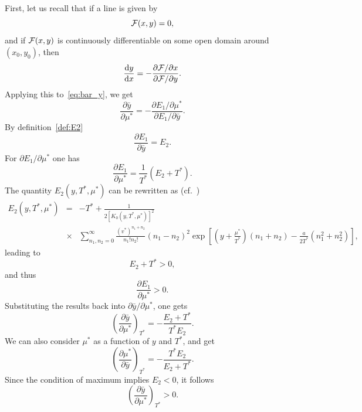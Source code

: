 \documentclass[12pt]{article}
\numberwithin{equation}{section}
\begin{document}
	First, let us recall that if a line is given by 
	\begin{equation*}
		{\cal F}(x,y) = 0,
	\end{equation*}
	and if ${\cal F}(x,y)$ is continuously differentiable on some open domain around $(x_0,y_0)$, then
	\begin{equation}
		\frac{{\rm d} y}{{\rm d} x} = - \frac{\partial {\cal F} / \partial x}{\partial {\cal F} / \partial y}.
	\end{equation}
	Applying this to~\eqref{eq:bar_y}, we get
	\begin{equation}
		\frac{\partial \bar{y}}{\partial \mu^*} = - \frac{\partial E_1 / \partial \mu^*}{\partial E_1 / \partial \bar{y}}.
	\end{equation}
	By definition~\eqref{def:E2}
	\begin{equation}
		\frac{\partial E_1}{\partial \bar{y}} = E_2.
	\end{equation}
	For $\partial E_1 / \partial \mu^*$ one has
	\begin{equation}
		\frac{\partial E_1}{\partial \mu^*} = \frac{1}{T^*} (E_2 + T^*).
	\end{equation}
	The quantity $E_2(y,T^*,\mu^*)$ can be rewritten as (cf.~\cite[(2.23)]{KKD20})
	\begin{eqnarray}
		E_2(y,T^*,\mu^*) & = & -T^* + \frac{1}{2 [K_0(y,T^*,\mu^*)]^2}
		\\
		& \times & \sum_{n_1, n_2 = 0}^{\infty} \frac{(v^*)^{n_1+n_2}}{n_1!n_2!}(n_1 - n_2)^2 \exp[\left(y + \frac{\mu^*}{T^*}\right)(n_1 + n_2) - \frac{a}{2T^*}(n_1^2 + n_2^2)],\nonumber
	\end{eqnarray}
	leading to
	\begin{equation}
		E_2 + T^* > 0,
	\end{equation}
	and thus
	\begin{equation}
		\frac{\partial E_1}{\partial \mu^*} > 0.
	\end{equation}
	Substituting the results back into $\partial \bar{y}/\partial \mu^*$, one gets
	\begin{equation}
		\left(\frac{\partial \bar{y}}{\partial \mu^*} \right)_{T^*} = -\frac{E_2 + T^*}{T^* E_2}.
	\end{equation}
	We can also consider $\mu^*$ as a function of $y$ and $T^*$, and get
	\begin{equation}
		\left(\frac{\partial \mu^*}{\partial \bar{y}} \right)_{T^*} = -\frac{T^* E_2}{E_2 + T^*}.
	\end{equation}
	Since the condition of maximum implies $E_2 < 0$, it follows
	\begin{equation}
		\left(\frac{\partial \bar{y}}{\partial \mu^*} \right)_{T^*} > 0.
	\end{equation}
	
\end{document}
